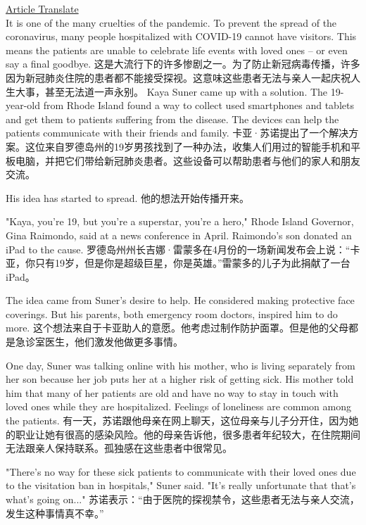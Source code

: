 \href{https://www.51voa.com/VOA_Special_English/program-collects-smartphones-for-coronavirus-hospital-patients-to-use-84557_1.html}{Article Translate} \\

It is one of the many cruelties of the pandemic. To prevent the spread of the coronavirus, many people hospitalized with COVID-19 cannot have visitors. This means the patients are unable to celebrate life events with loved ones – or even say a final goodbye.
这是大流行下的许多惨剧之一。为了防止新冠病毒传播，许多因为新冠肺炎住院的患者都不能接受探视。这意味这些患者无法与亲人一起庆祝人生大事，甚至无法道一声永别。
Kaya Suner came up with a solution. The 19-year-old from Rhode Island found a way to collect used smartphones and tablets and get them to patients suffering from the disease. The devices can help the patients communicate with their friends and family.
卡亚·苏诺提出了一个解决方案。这位来自罗德岛州的19岁男孩找到了一种办法，收集人们用过的智能手机和平板电脑，并把它们带给新冠肺炎患者。这些设备可以帮助患者与他们的家人和朋友交流。

His idea has started to spread.
他的想法开始传播开来。

"Kaya, you're 19, but you're a superstar, you're a hero," Rhode Island Governor, Gina Raimondo, said at a news conference in April. Raimondo's son donated an iPad to the cause.
罗德岛州州长吉娜·雷蒙多在4月份的一场新闻发布会上说：“卡亚，你只有19岁，但是你是超级巨星，你是英雄。”雷蒙多的儿子为此捐献了一台iPad。

The idea came from Suner's desire to help. He considered making protective face coverings. But his parents, both emergency room doctors, inspired him to do more.
这个想法来自于卡亚助人的意愿。他考虑过制作防护面罩。但是他的父母都是急诊室医生，他们激发他做更多事情。

One day, Suner was talking online with his mother, who is living separately from her son because her job puts her at a higher risk of getting sick. His mother told him that many of her patients are old and have no way to stay in touch with loved ones while they are hospitalized. Feelings of loneliness are common among the patients.
有一天，苏诺跟他母亲在网上聊天，这位母亲与儿子分开住，因为她的职业让她有很高的感染风险。他的母亲告诉他，很多患者年纪较大，在住院期间无法跟亲人保持联系。孤独感在这些患者中很常见。

"There's no way for these sick patients to communicate with their loved ones due to the visitation ban in hospitals," Suner said. "It's really unfortunate that that's what's going on..."
苏诺表示：“由于医院的探视禁令，这些患者无法与亲人交流，发生这种事情真不幸。”

